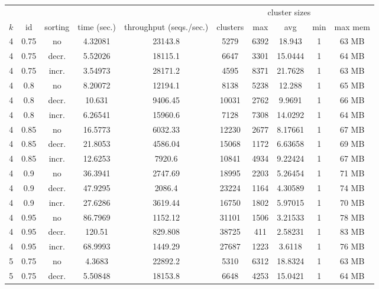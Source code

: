 \begingroup
\setlength{\LTleft}{-20cm plus -1fill}
\setlength{\LTright}{\LTleft}
\begin{longtable}{c|c|c|c|c|c|c|c|c|c}
  & & & & & &\multicolumn{3}{c|}{cluster sizes} & \\
  $k$ & id & sorting & time (sec.) & throughput (seqs./sec.) & clusters & max & avg & min & max mem \\
  \hline \hline
  4  &  0.75  & no    & 4.32081  &  23143.8 &  5279   &  6392  &  18.943   &  1  & 63  MB \\
  4  &  0.75  & decr. & 5.52026  &  18115.1 &  6647   &  3301  &  15.0444  &  1  & 64  MB \\
  4  &  0.75  & incr. & 3.54973  &  28171.2 &  4595   &  8371  &  21.7628  &  1  & 63  MB \\
  \hline
  4  &  0.8   & no    & 8.20072  &  12194.1 &  8138   &  5238  &  12.288   &  1  & 65  MB \\
  4  &  0.8   & decr. & 10.631   &  9406.45 &  10031  &  2762  &  9.9691   &  1  & 66  MB \\
  4  &  0.8   & incr. & 6.26541  &  15960.6 &  7128   &  7308  &  14.0292  &  1  & 64  MB \\
  \hline
  4  &  0.85  & no    & 16.5773  &  6032.33 &  12230  &  2677  &  8.17661  &  1  & 67  MB \\
  4  &  0.85  & decr. & 21.8053  &  4586.04 &  15068  &  1172  &  6.63658  &  1  & 69  MB \\
  4  &  0.85  & incr. & 12.6253  &  7920.6  &  10841  &  4934  &  9.22424  &  1  & 67  MB \\
  \hline
  4  &  0.9   & no    & 36.3941  &  2747.69 &  18995  &  2203  &  5.26454  &  1  & 71  MB \\
  4  &  0.9   & decr. & 47.9295  &  2086.4  &  23224  &  1164  &  4.30589  &  1  & 74  MB \\
  4  &  0.9   & incr. & 27.6286  &  3619.44 &  16750  &  1802  &  5.97015  &  1  & 70  MB \\
  \hline
  4  &  0.95  & no    & 86.7969  &  1152.12 &  31101  &  1506  &  3.21533  &  1  & 78  MB \\
  4  &  0.95  & decr. & 120.51   &  829.808 &  38725  &  411   &  2.58231  &  1  & 83  MB \\
  4  &  0.95  & incr. & 68.9993  &  1449.29 &  27687  &  1223  &  3.6118   &  1  & 76  MB \\
  \hline
  5  &  0.75  & no    & 4.3683   &  22892.2 &  5310   &  6312  &  18.8324  &  1  & 63  MB \\
  5  &  0.75  & decr. & 5.50848  &  18153.8 &  6648   &  4253  &  15.0421  &  1  & 64  MB \\

\end{longtable}
